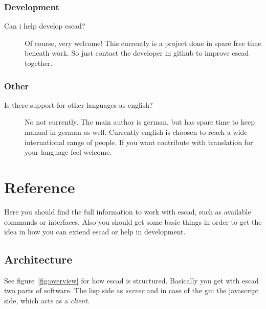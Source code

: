 \documentclass[a4paper, 12pt, openany]{scrbook}
\begin{document}
\subsection{Development}
\begin{description}
\item[Can i help develop escad?] Of course, very welcome! This currently is a project done in spare free time beneath work. So just contact the developer in github to improve escad together.
\end{description}
\subsection{Other}
\begin{description}
\item[Is there support for other languages as english?]  No not currently. The main author is german, but has spare time to keep manual in german as well. Currently english is choosen to reach a wide international range of people. If you want contribute with translation for your language feel welcome.
\end{description}
\chapter{Reference}
Here you should find the full information to work with escad, such as available commands or interfaces. Also you should get some basic things in order to get the idea in how you can extend escad or help in development.
\section{Architecture}
See figure~\ref{fig:overview} for how escad is structured. Basically you get with escad two parts of software. The lisp side as \emph{server} and in case of the gui the javascript side, which acts as a \emph{client}.
\end{document}
